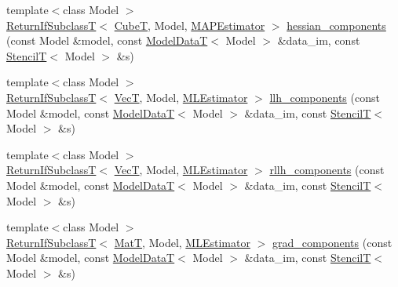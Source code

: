 \begin{DoxyCompactItemize}
\item 
{\footnotesize template$<$class Model $>$ }\\\hyperlink{namespacemappel_a3b77d227658ba3ba9e16fea6fa6e626d}{Return\+If\+SubclassT}$<$ \hyperlink{namespacemappel_ab2afab4e6c8805e83946670d882768c2}{CubeT}, Model, \hyperlink{classmappel_1_1MAPEstimator}{M\+A\+P\+Estimator} $>$ \hyperlink{namespacemappel_1_1methods_1_1objective_1_1debug_ab6f1cb872d35213373fae3ad7fac035f}{hessian\+\_\+components} (const Model \&model, const \hyperlink{namespacemappel_a97f050df953605381ae9c901c3b125f1}{Model\+DataT}$<$ Model $>$ \&data\+\_\+im, const \hyperlink{namespacemappel_a3a06598240007876f8c4bf834ad86197}{StencilT}$<$ Model $>$ \&s)
\item 
{\footnotesize template$<$class Model $>$ }\\\hyperlink{namespacemappel_a3b77d227658ba3ba9e16fea6fa6e626d}{Return\+If\+SubclassT}$<$ \hyperlink{namespacemappel_a2225ad69f358daa3f4f99282a35b9a3a}{VecT}, Model, \hyperlink{classmappel_1_1MLEstimator}{M\+L\+Estimator} $>$ \hyperlink{namespacemappel_1_1methods_1_1objective_1_1debug_a4c1a85963ef4d11a91b3f717d230f5a3}{llh\+\_\+components} (const Model \&model, const \hyperlink{namespacemappel_a97f050df953605381ae9c901c3b125f1}{Model\+DataT}$<$ Model $>$ \&data\+\_\+im, const \hyperlink{namespacemappel_a3a06598240007876f8c4bf834ad86197}{StencilT}$<$ Model $>$ \&s)
\item 
{\footnotesize template$<$class Model $>$ }\\\hyperlink{namespacemappel_a3b77d227658ba3ba9e16fea6fa6e626d}{Return\+If\+SubclassT}$<$ \hyperlink{namespacemappel_a2225ad69f358daa3f4f99282a35b9a3a}{VecT}, Model, \hyperlink{classmappel_1_1MLEstimator}{M\+L\+Estimator} $>$ \hyperlink{namespacemappel_1_1methods_1_1objective_1_1debug_a7ec8943da4b014006711299a8eebccab}{rllh\+\_\+components} (const Model \&model, const \hyperlink{namespacemappel_a97f050df953605381ae9c901c3b125f1}{Model\+DataT}$<$ Model $>$ \&data\+\_\+im, const \hyperlink{namespacemappel_a3a06598240007876f8c4bf834ad86197}{StencilT}$<$ Model $>$ \&s)
\item 
{\footnotesize template$<$class Model $>$ }\\\hyperlink{namespacemappel_a3b77d227658ba3ba9e16fea6fa6e626d}{Return\+If\+SubclassT}$<$ \hyperlink{namespacemappel_a7091ab87c528041f7e2027195fad8915}{MatT}, Model, \hyperlink{classmappel_1_1MLEstimator}{M\+L\+Estimator} $>$ \hyperlink{namespacemappel_1_1methods_1_1objective_1_1debug_a79653687e63f306852dd988484be56f8}{grad\+\_\+components} (const Model \&model, const \hyperlink{namespacemappel_a97f050df953605381ae9c901c3b125f1}{Model\+DataT}$<$ Model $>$ \&data\+\_\+im, const \hyperlink{namespacemappel_a3a06598240007876f8c4bf834ad86197}{StencilT}$<$ Model $>$ \&s)

\end{DoxyCompactItemize}
